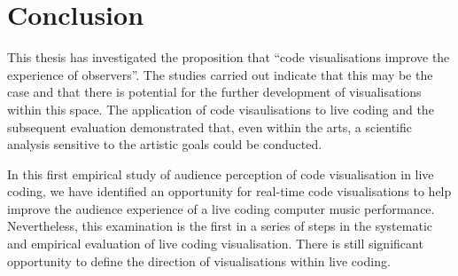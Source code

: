 
\chapter{Conclusion}
\label{chap:conclusion}

This thesis has investigated the proposition that ``code visualisations improve the experience of observers''. The studies carried out indicate that this may be the case and that there is potential for the further development of visualisations within this space. The application of code visaulisations to live coding and the subsequent evaluation demonstrated that, even within the arts, a scientific analysis sensitive to the artistic goals could be conducted. 

In this first empirical study of audience perception of code visualisation in live coding, we have identified an opportunity for real-time code visualisations to help improve the audience experience of a live coding computer music performance. Nevertheless, this examination is the first in a series of steps in the systematic and empirical evaluation of live coding visualisation. There is still significant opportunity to define the direction of visualisations within live coding.




